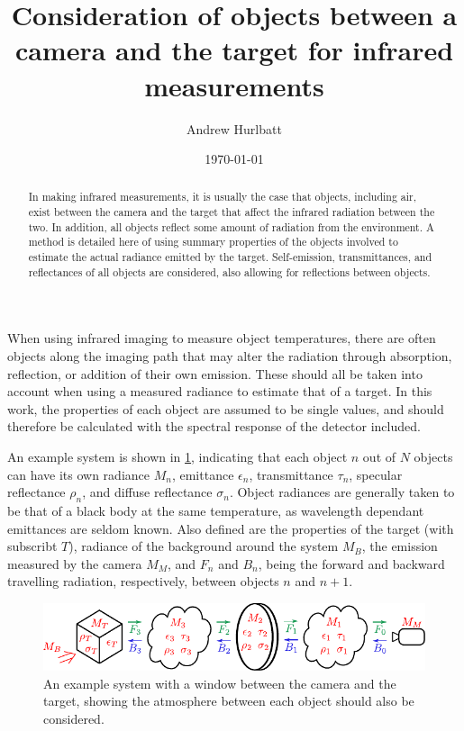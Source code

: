 \documentclass[11pt,a4paper]{article}
\title{Consideration of objects between a camera and the target for infrared measurements}
\author{Andrew Hurlbatt}
\date{\today}
\begin{document}
	
	\maketitle
	
	\begin{abstract}
		In making infrared measurements, it is usually the case that objects, including air, exist between the camera and the target that affect the infrared radiation between the two. In addition, all objects reflect some amount of radiation from the environment. A method is detailed here of using summary properties of the objects involved to estimate the actual radiance emitted by the target. Self-emission, transmittances, and reflectances of all objects are considered, also allowing for reflections between objects.
	\end{abstract}

When using infrared imaging to measure object temperatures, there are often objects along the imaging path that may alter the radiation through absorption, reflection, or addition of their own emission. These should all be taken into account when using a measured radiance to estimate that of a target. In this work, the properties of each object are assumed to be single values, and should therefore be calculated with the spectral response of the detector included. 

An example system is shown in \cref{fig:scheme}, indicating that each object $ n $ out of $ N $ objects can have its own radiance $ M_n $, emittance $ \epsilon_n $, transmittance $ \tau_n $, specular reflectance $ \rho_n $, and diffuse reflectance $ \sigma_n $. Object radiances are generally taken to be that of a black body at the same temperature, as wavelength dependant emittances are seldom known. Also defined are the properties of the target (with subscribt $ T $), radiance of the background around the system $ M_B $, the emission measured by the camera $ M_M $, and $ F_n $ and $ B_n $, being the forward and backward travelling radiation, respectively, between objects $ n $ and $ n+1 $.

\begin{figure}
	\centering
	\includegraphics[width=\textwidth]{./infroptics_scheme.pdf}
	\caption{An example system with a window between the camera and the target, showing the atmosphere between each object should also be considered.}
	\label{fig:scheme}
\end{figure}
\end{document}
